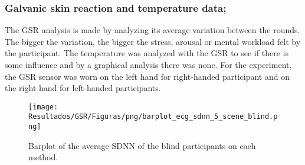 \subsubsection{Galvanic skin reaction and temperature data;}
\label{subsec:results_gsr_temp}

The GSR analysis is made by analyzing its average variation between the rounds. The bigger the variation, the bigger the stress, arousal or mental workload felt by the participant. The temperature was analyzed with the GSR to see if there is some influence and by a graphical analysis there was none. For the experiment, the GSR sensor was worn on the left hand for right-handed participant and on the right hand for left-handed participants.





\begin{figure}[!htb]
    \centering
    \texttt{[image: Resultados/GSR/Figuras/png/barplot\_ecg\_sdnn\_5\_scene\_blind.png]}
    \caption{Barplot of the average SDNN of the blind participants on each method.}
    \label{fig:barplot_ecg_sdnn_5_scene_blind}
\end{figure}






